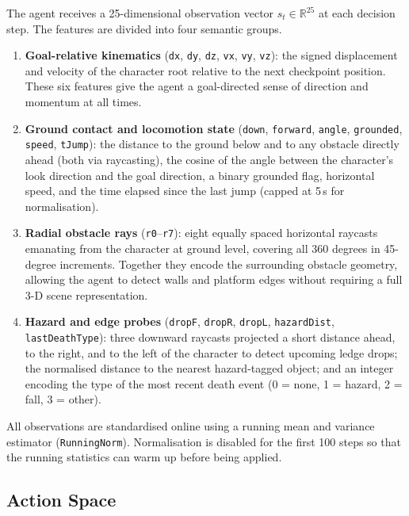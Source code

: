 \documentclass[11pt]{article}
\begin{document}
The agent receives a 25-dimensional observation vector $s_t \in
\mathbb{R}^{25}$ at each decision step. The features are divided into
four semantic groups.

\begin{enumerate}
  \item \textbf{Goal-relative kinematics} (\texttt{dx}, \texttt{dy},
    \texttt{dz}, \texttt{vx}, \texttt{vy}, \texttt{vz}): the signed
    displacement and velocity of the character root relative to the next
    checkpoint position. These six features give the agent a
    goal-directed sense of direction and momentum at all times.

  \item \textbf{Ground contact and locomotion state} (\texttt{down},
    \texttt{forward}, \texttt{angle}, \texttt{grounded}, \texttt{speed},
    \texttt{tJump}): the distance to the ground below and to any obstacle
    directly ahead (both via raycasting), the cosine of the angle between
    the character's look direction and the goal direction, a binary
    grounded flag, horizontal speed, and the time elapsed since the last
    jump (capped at 5\,s for normalisation).

  \item \textbf{Radial obstacle rays} (\texttt{r0}--\texttt{r7}): eight
    equally spaced horizontal raycasts emanating from the character at
    ground level, covering all 360 degrees in 45-degree increments. Together
    they encode the surrounding obstacle geometry, allowing the agent to
    detect walls and platform edges without requiring a full 3-D scene
    representation.

  \item \textbf{Hazard and edge probes} (\texttt{dropF}, \texttt{dropR},
    \texttt{dropL}, \texttt{hazardDist}, \texttt{lastDeathType}): three
    downward raycasts projected a short distance ahead, to the right, and
    to the left of the character to detect upcoming ledge drops; the
    normalised distance to the nearest hazard-tagged object; and an
    integer encoding the type of the most recent death event (0 = none,
    1 = hazard, 2 = fall, 3 = other).
\end{enumerate}

All observations are standardised online using a running mean and
variance estimator (\texttt{RunningNorm}). Normalisation is disabled for
the first 100 steps so that the running statistics can warm up before
being applied.

\subsection{Action Space}
\end{document}
